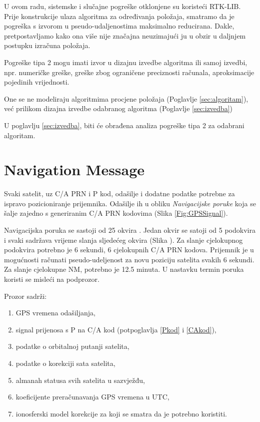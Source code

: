 \documentclass[a4paper,twoside,12pt]{memoir} %
\begin{document}
	U ovom radu, sistemske i slučajne pogreške otklonjene su koristeći RTK-LIB.
	 Prije konstrukcije ulaza algoritma za određivanja položaja, smatramo da je
	pogreška s izvorom u pseudo-udaljenostima maksimalno reducirana.
	Dakle, pretpostavljamo kako ona više nije značajna
	neuzimajući ju u obzir u daljnjem postupku izračuna položaja\label{stranica:greskaOvisisamoOxOpravdano}.
	
	\vspace{0.5cm}
	Pogreške tipa 2 mogu imati izvor u dizajnu izvedbe algoritma ili samoj izvedbi, npr.
	numeričke greške, greške zbog ograničene preciznosti računala,
	aproksimacije pojedinih vrijednosti.
	
	One se ne modeliraju algoritmima procjene položaja (Poglavlje \ref{sec:algoritam}), već prilikom dizajna izvedbe odabranog algoritma (Poglavlje \ref{sec:izvedba})
	
	U poglavlju \ref{sec:izvedba}, biti će obrađena analiza pogreške tipa 2 za odabrani algoritam.
	
	\section{Navigation Message}\label{sec:NM} %
	Svaki satelit, uz C/A PRN i P kod, odašilje i dodatne podatke potrebne za ispravo pozicioniranje prijemnika. Odašilje ih u obliku \textit{Navigacijske poruke} koja se šalje zajedno s generiranim C/A PRN kodovima (Slika \ref{Fig:GPSSignal}).
	
	Navigacijska poruka se sastoji od 25 okvira \cite{bookProcessing}.
	Jedan okvir se satoji od 5 podokvira i svaki sadržava vrijeme slanja
	sljedećeg okvira (Slika \cite{GPS:1}). Za slanje cjelokupnog podokvira potrebno je 6 sekundi,
	6 cjelokupnih C/A PRN kodova. Prijemnik je u mogućnosti računati pseudo-udeljenost za novu poziciju satelita svakih
	6 sekundi.
	Za slanje cjelokupne NM, potrebno je 12.5 minuta.
	U nastavku termin poruka koristi se misleći na podprozor.
	\vspace{0.5cm}
	
	Prozor sadrži:
	\begin{enumerate}
		\item GPS vremena odašiljanja,
		\item signal prijenosa s P na C/A kod (potpoglavlja \ref{Pkod} i \ref{CAkod}),
		\item podatke o orbitalnoj putanji satelita,
		\item podatke o korekciji sata satelita,
		\item almanah statusa svih satelita u sazvježđu,
		\item koeficijente preračunavanja GPS vremena u UTC,
		\item ionosferski model korekcije za koji se smatra da je potrebno koristiti.
	\end{enumerate}
	
\end{document}

